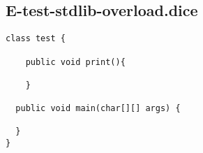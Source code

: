 \subsection{E-test-stdlib-overload.dice}
\begin{verbatim}
class test {

	public void print(){

	}

  public void main(char[][] args) {
     
  }
}
\end{verbatim}